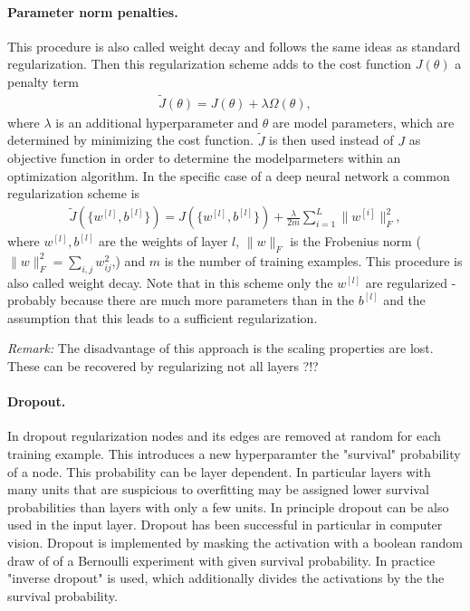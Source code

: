 \documentclass[12pt,a4paper]{article}
\begin{document}
\paragraph{Parameter norm penalties.} This procedure is also called weight decay and follows the same ideas as standard regularization.  Then this regularization scheme adds to the cost function $J(\theta)$  a penalty term
\begin{align}
    \tilde J(\theta)  =  J(\theta) + \lambda \Omega(\theta), 
\end{align}
where $\lambda$ is an additional hyperparameter and $\theta$ are model parameters, which are determined by minimizing the cost function. $\tilde J$ is then used instead of $J$ as objective function in order to determine the modelparmeters within an optimization algorithm. 
In the specific case of a deep neural network a common regularization scheme is
\begin{align}
	\tilde J(\{w^{[l]}, b^{[l]}\}) =  J(\{w^{[l]}, b^{[l]}\}) + \frac{\lambda}{2m} \sum _{i=1}^L \lVert w^{[i]} \rVert _F ^2, 
\end{align}
where $w^{[l]}, b^{[l]}$ are the weights of layer $l$, $\lVert w \rVert _F$ is the Frobenius norm  ($\lVert w \rVert _F ^2 = \sum_{i, j} w_{ij}^2$,) and $m$ is the number of training examples. This procedure is also called weight decay. Note that in this scheme only the $w^{[l]}$ are regularized - probably because there are much more parameters than in the $b^{[l]}$ and the assumption that this leads to a sufficient regularization.

\textit{Remark:} The disadvantage of this approach is the scaling properties are lost. These can be recovered by regularizing not all layers \cite{Srihari:regularization_talk} ?!?	

\paragraph{Dropout.} In dropout regularization nodes and its edges are removed at random for each training example. This introduces a new hyperparamter the "survival" probability of a node.  This probability can be layer dependent. In particular layers with many units that are suspicious to overfitting may be assigned lower survival probabilities than layers with only a few units. In principle dropout can be also used in the input layer. Dropout has been successful in particular in computer vision. Dropout is implemented by masking the activation with a boolean random draw of of a Bernoulli experiment with given survival probability. In practice  "inverse dropout" is used, which additionally divides the activations by the the survival probability.
\end{document}
